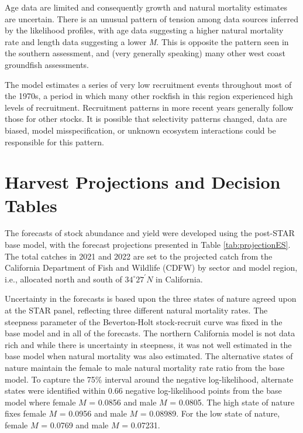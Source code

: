 \documentclass[11pt,
  english,
]{article}
\begin{document}
Age data are limited and consequently growth and natural mortality estimates are uncertain. There is an unusual pattern of tension among data sources inferred by the likelihood profiles, with age data suggesting a higher natural mortality rate and length data suggesting a lower \emph{M}. This is opposite the pattern seen in the southern assessment, and (very generally speaking) many other west coast groundfish assessments.

The model estimates a series of very low recruitment events throughout most of the 1970s, a period in which many other rockfish in this region experienced high levels of recruitment. Recruitment patterns in more recent years generally follow those for other stocks. It is possible that selectivity patterns changed, data are biased, model misspecification, or unknown ecosystem interactions could be responsible for this pattern.


\hypertarget{harvest-projections-and-decision-tables}{%
\section{Harvest Projections and Decision Tables}\label{harvest-projections-and-decision-tables}}

\leavevmode\tagmcend\tagstructend

The forecasts of stock abundance and yield were developed using the post-STAR base model, with the forecast projections presented in Table \ref{tab:projectionES}. The total catches in 2021 and 2022 are set to the projected catch from the California Department of Fish and Wildlife (CDFW) by sector and model region, i.e., allocated north and south of $34^\circ 27^\prime N$ in California.

Uncertainty in the forecasts is based upon the three states of nature agreed upon at the STAR panel, reflecting three different natural mortality rates. The steepness parameter of the Beverton-Holt stock-recruit curve was fixed in the base model and in all of the forecasts. The northern California model is not data rich and while there is uncertainty in steepness, it was not well estimated in the base model when natural mortality was also estimated. The alternative states of nature maintain the female to male natural mortality rate ratio from the base model. To capture the 75\% interval around the negative log-likelihood, alternate states were identified within 0.66 negative log-likelihood points from the base model where female {\(M\)\leavevmode\tagmcend\tagstructend} = 0.0856 and male {\(M\)\leavevmode\tagmcend\tagstructend} = 0.0805. The high state of nature fixes female {\(M\)\leavevmode\tagmcend\tagstructend} = 0.0956 and male {\(M\)\leavevmode\tagmcend\tagstructend} = 0.08989. For the low state of nature, female {\(M\)\leavevmode\tagmcend\tagstructend} = 0.0769 and male {\(M\)\leavevmode\tagmcend\tagstructend} = 0.07231.
\end{document}
